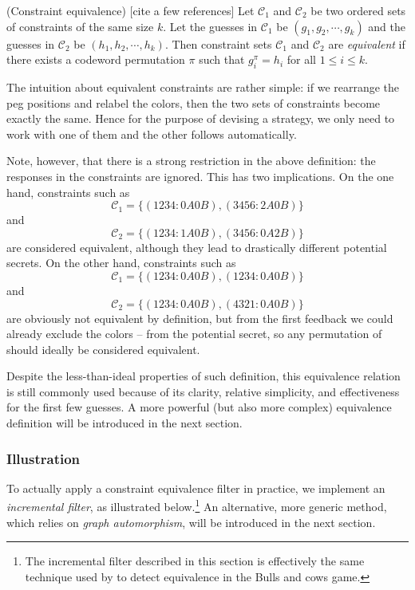 \begin{definition}
(Constraint equivalence) [cite a few references] Let $\mathcal{C}_1$ and $\mathcal{C}_2$ be two ordered sets of constraints of the same size $k$. Let the guesses in $\mathcal{C}_1$ be $(g_1,g_2,\cdots,g_k)$ and the guesses in $\mathcal{C}_2$ be $(h_1,h_2,\cdots,h_k)$. Then constraint sets $\mathcal{C}_1$ and $\mathcal{C}_2$ are \emph{equivalent} if there exists a codeword permutation $\pi$ such that
$g_i^\pi = h_i$ for all $1 \le i \le k$.
\end{definition}

The intuition about equivalent constraints are rather simple: if we rearrange the peg positions and relabel the colors, then the two sets of constraints become exactly the same. Hence for the purpose of devising a strategy, we only need to work with one of them and the other follows automatically.

Note, however, that there is a strong restriction in the above definition: the responses in the constraints are ignored. This has two implications. On the one hand, constraints such as 
\[
\mathcal{C}_1 = \{ (1234:0A0B), (3456:2A0B) \}
\]
and
\[
\mathcal{C}_2 = \{ (1234:1A0B), (3456:0A2B) \}
\]
are considered equivalent, although they lead to drastically different potential secrets. On the other hand, constraints such as
\[
\mathcal{C}_1 = \{ (1234:0A0B), (1234:0A0B) \}
\]
and
\[
\mathcal{C}_2 = \{ (1234:0A0B), (4321:0A0B) \}
\]
are obviously not equivalent by definition, but from the first feedback  we could already exclude the colors  --  from the potential secret, so any permutation of  should ideally be considered equivalent.

Despite the less-than-ideal properties of such definition, this equivalence relation is still commonly used \cite{neuwirth81,koyama93,francis10} because of its clarity, relative simplicity, and effectiveness for the first few guesses. A more powerful (but also more complex) equivalence definition will be introduced in the next section.

\subsubsection{Illustration}

To actually apply a constraint equivalence filter in practice, we implement an \emph{incremental filter}, as illustrated below.\footnote{The incremental filter described in this section is effectively the same technique used by \cite{francis10} to detect equivalence in the Bulls and cows game.}
An alternative, more generic method, which relies on \emph{graph automorphism}, will be introduced in the next section.

